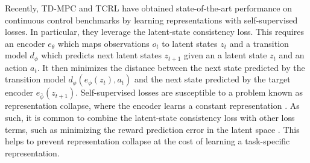 \documentclass{article}
\theoremstyle{plain}
\theoremstyle{definition}
\theoremstyle{remark}
\begin{document}
Recently, TD-MPC \citep{hansenTemporalDifferenceLearning2022} and TCRL \citep{zhaoSimplifiedTemporalConsistency2023}
have obtained state-of-the-art performance on continuous control benchmarks by learning
representations with self-supervised losses.
In particular, they leverage the latent-state consistency loss.
This requires an encoder $e_{\theta}$ which maps observations $o_{t}$ to latent states $z_{t}$ and a transition model $d_{\phi}$ which predicts
next latent states $z_{t+1}$ given an a latent state $z_{t}$ and an action $a_{t}$.
It then minimizes the distance between the next state predicted by the transition model $d_{\phi}(e_{\phi}(z_{t}), a_{t})$
and the next state predicted by the target encoder $e_{\bar{\phi}}(z_{t+1})$.
Self-supervised losses are susceptible to a problem known as representation collapse, where the encoder learns a constant
representation \cite{jingUnderstandingDimensionalCollapse2021}.
As such, it is common to combine the latent-state consistency loss with other loss terms, such as
minimizing the reward prediction error in the latent space
\citep{zhangLearningInvariantRepresentations2020,zhaoSimplifiedTemporalConsistency2023,hansenTemporalDifferenceLearning2022,geladaDeepMDPLearningContinuous2019,rezaei-shoshtariContinuousMDPHomomorphisms2022}.
This helps to prevent representation collapse at the cost of learning a task-specific representation.

\end{document}
